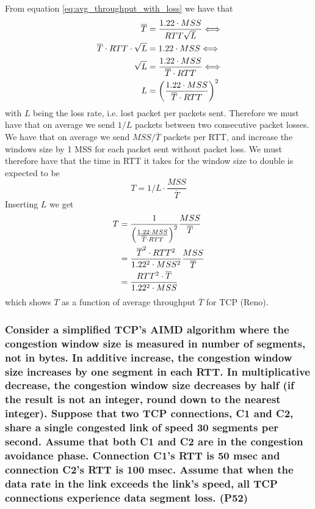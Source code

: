 From equation \ref{eq:avg_throughput_with_loss} we have that
\begin{equation*}
  \begin{split}
    \overline{T} &= \frac{1.22 \cdot MSS}{RTT \sqrt{L}} \Longleftrightarrow \\
    \overline{T} \cdot RTT \cdot \sqrt{L} &= 1.22 \cdot MSS \Longleftrightarrow \\
    \sqrt{L} &= \frac{1.22 \cdot MSS}{\overline{T} \cdot RTT} \Longleftrightarrow \\
    L &= \left (\frac{1.22 \cdot MSS}{\overline{T} \cdot RTT}\right)^2
  \end{split}
\end{equation*}
with $L$ being the loss rate, i.e. lost packet per packets sent. Therefore we must have that on average we send $1/L$ packets between two consecutive packet losses. We have that on average we send $MSS/\overline{T}$ packets per RTT, and increase the windows size by 1 MSS for each packet sent without packet loss. We must therefore have that the time in RTT it takes for the window size to double is expected to be
\begin{equation*}
  T = 1/L \cdot \frac{MSS}{\overline{T}}  
\end{equation*}
Inserting $L$ we get
\begin{equation*}
  \begin{split}
    T &= \frac{1}{ \left (\frac{1.22 \cdot MSS}{\overline{T} \cdot RTT}\right)^2} \frac{MSS}{\overline{T}}  \\
    &= \frac{\overline{T}^2 \cdot RTT^2}{1.22^2 \cdot MSS^2} \frac{MSS}{\overline{T}} \\
    &= \frac{RTT^2 \cdot \overline{T}}{1.22^2 \cdot MSS}
  \end{split}
\end{equation*}
which shows $T$ as a function of average throughput $\overline{T}$ for TCP (Reno).


\subsubsection{Consider a simplified TCP's AIMD algorithm where the congestion window size is measured in number of segments, not in bytes. In additive increase, the congestion window size increases by one segment in each RTT. In multiplicative decrease, the congestion window size decreases by half (if the result is not an integer, round down to the nearest integer). Suppose that two TCP connections, C1 and C2, share a single congested link of speed 30 segments per second. Assume that both C1 and C2 are in the congestion avoidance phase. Connection C1's RTT is 50 msec and connection C2's RTT is 100 msec. Assume that when the data rate in the link exceeds the link's speed, all  TCP connections experience data segment loss. (P52)}

